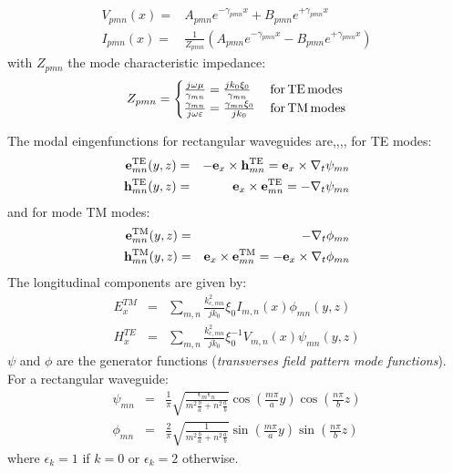 \begin{subequations}
	\begin{align}
V_{pmn}(x) = & A_{pmn}e^{-\gamma_{pmn}x} + B_{pmn}e^{+\gamma_{pmn}x}
\label{eq:valeur_propre_V}\\
I_{pmn}(x) = & \frac{1}{Z_{pmn}}\left(A_{pmn}e^{-\gamma_{pmn}x} - B_{pmn}e^{+\gamma_{pmn}x}\right)
\label{eq:valeur_propre_I}
	\end{align}
	 \label{eq:rectwg_modes_eigenvalues}
\end{subequations}
with $Z_{pmn}$ the mode characteristic impedance:
\begin{equation}
Z_{pmn} = 
\begin{cases}
\frac{j\omega\mu}{\gamma_{mn}} = \frac{j k_0 \xi_0}{\gamma_{mn}} & \mathrm{\, for\, {\mathrm{TE}}\, modes}\\
\frac{\gamma_{mn}}{j\omega\varepsilon}=\frac{\gamma_{mn} \xi_0}{j k_0} & \mathrm{\, for\,{\mathrm{TM}}\, modes}
\end{cases}
\end{equation}

The modal eingenfunctions for rectangular waveguides are\cite[§2.2]{marcuvitz1951},\cite[§8.1,§8.2]{Harrington2001},\cite[§5.4]{Collin1990},\cite[§3.3]{pozar2012},\cite[Appendix A]{Bers1981} for TE modes:
\begin{eqnarray}
\mathbf{e}_{mn}^{{\mathrm{TE}}}(y,z) & = & -{\mathbf e}_x \times \mathbf{h}_{mn}^{{\mathrm{TE}}} = {\mathbf e}_x \times \nabla_{t} \psi_{mn}\\
\mathbf{h}_{mn}^{{\mathrm{TE}}}(y,z) & = &  {\mathbf e}_x \times \mathbf{e}_{mn}^{{\mathrm{TE}}} = -\nabla_{t} \psi_{mn}
\label{eq:TEmodes_eingenfunctions}
\end{eqnarray}
and for mode TM modes:
\begin{eqnarray}
\mathbf{e}_{mn}^{{\mathrm{TM}}}(y,z) & = & -\nabla_{t}\phi_{mn}\\
\mathbf{h}_{mn}^{{\mathrm{TM}}}(y,z) & = & {\mathbf e}_x \times\mathbf{e}_{mn}^{{\mathrm{TM}}}= -{\mathbf e}_x \times\nabla_{t}\phi_{mn}
\label{eq:TMmodes_eingenfunctions}
\end{eqnarray}
The longitudinal components are given by:
\begin{eqnarray}
E_{x}^{TM} & = & \sum_{m,n}\frac{k_{c,mn}^{2}}{j k_{0}}\xi_0 I_{m,n}(x)\phi_{mn}(y,z)\\
H_{x}^{TE} & = & \sum_{m,n}\frac{k_{c,mn}^{2}}{j k_{0}}\xi_0^{-1} V_{m,n}(x)\psi_{mn}(y,z)
\label{eq:TETM_longitudinal_components}
\end{eqnarray}
$\psi$ and $\phi$ are the generator functions (\emph{transverses field pattern mode functions}). For a rectangular waveguide\cite[Table 8.1]{Harrington2001}\cite[§1.2 (6.c),§2.2]{marcuvitz1951}\cite[Appendix A, A13-14]{Bers1981}:
\begin{eqnarray}
\psi_{mn} & = & \frac{1}{\pi}\sqrt{\frac{\epsilon_{m}\epsilon_{n}}{m^{2}\frac{b}{a}+n^{2}\frac{a}{b}}}\cos\left(\frac{m\pi}{a}y\right)\cos\left(\frac{n\pi}{b}z\right)\label{eq:fonction_generatrice_TE}\\
\phi_{mn} & = & \frac{2}{\pi}\sqrt{\frac{1}{m^{2}\frac{b}{a}+n^{2}\frac{a}{b}}}\sin\left(\frac{m\pi}{a}y\right)\sin\left(\frac{n\pi}{b}z\right)\label{eq:fonction_generatrice_TM}
\end{eqnarray}
where $\epsilon_{k}=1$ if $k=0$ or $\epsilon_{k}=2$ otherwise.

